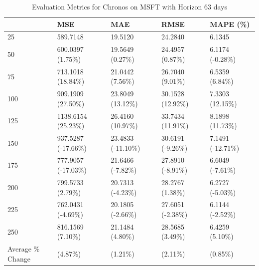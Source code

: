 \begin{table}
\caption{Evaluation Metrics for Chronos on MSFT with Horizon 63 days}
\label{tab:chronos_base_MSFT_h63_metrics}
\begin{tabular}{lllll}
\toprule
 & MSE & MAE & RMSE & MAPE (\%) \\
\midrule
25 & 589.7148 & 19.5120 & 24.2840 & 6.1345 \\
50 & 600.0397 (1.75\%) & 19.5649 (0.27\%) & 24.4957 (0.87\%) & 6.1174 (-0.28\%) \\
75 & 713.1018 (18.84\%) & 21.0442 (7.56\%) & 26.7040 (9.01\%) & 6.5359 (6.84\%) \\
100 & 909.1909 (27.50\%) & 23.8049 (13.12\%) & 30.1528 (12.92\%) & 7.3303 (12.15\%) \\
125 & 1138.6154 (25.23\%) & 26.4160 (10.97\%) & 33.7434 (11.91\%) & 8.1898 (11.73\%) \\
150 & 937.5287 (-17.66\%) & 23.4833 (-11.10\%) & 30.6191 (-9.26\%) & 7.1491 (-12.71\%) \\
175 & 777.9057 (-17.03\%) & 21.6466 (-7.82\%) & 27.8910 (-8.91\%) & 6.6049 (-7.61\%) \\
200 & 799.5733 (2.79\%) & 20.7313 (-4.23\%) & 28.2767 (1.38\%) & 6.2727 (-5.03\%) \\
225 & 762.0431 (-4.69\%) & 20.1805 (-2.66\%) & 27.6051 (-2.38\%) & 6.1144 (-2.52\%) \\
250 & 816.1569 (7.10\%) & 21.1484 (4.80\%) & 28.5685 (3.49\%) & 6.4259 (5.10\%) \\
Average \% Change & (4.87\%) & (1.21\%) & (2.11\%) & (0.85\%) \\
\bottomrule
\end{tabular}
\end{table}
